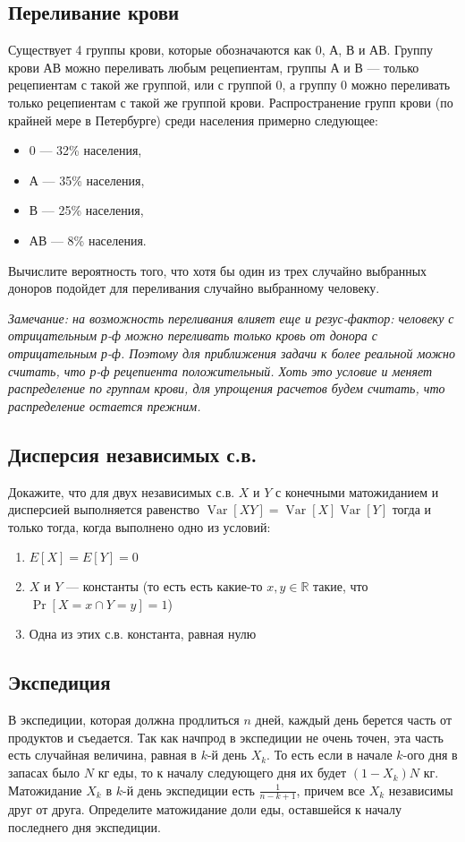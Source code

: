 \documentclass[12pt]{article}
\newcommand\R{\mathbb{R}}
\DeclareMathOperator{\Var}{Var}
\begin{document}
\subsection{Переливание крови}
Существует 4 группы крови, которые обозначаются как 0, А, В и АВ. Группу крови АВ можно переливать любым рецепиентам, группы А и В --- только рецепиентам с такой же группой, или с группой 0, а группу 0 можно переливать только рецепиентам с такой же группой крови. Распространение групп крови (по крайней мере в Петербурге) среди населения примерно следующее:
\begin{itemize}
    \item 0 --- 32\% населения,
    \item А --- 35\% населения,
    \item В --- 25\% населения,
    \item АВ --- 8\% населения.
\end{itemize}
Вычислите вероятность того, что хотя бы один из трех случайно выбранных доноров подойдет для переливания случайно выбранному человеку. 

\emph{Замечание: на возможность переливания влияет еще и резус-фактор: человеку с отрицательным р-ф можно переливать только кровь от донора с отрицательным р-ф. Поэтому для приближения задачи к более реальной можно считать, что р-ф рецепиента положительный. Хоть это условие и меняет распределение по группам крови, для упрощения расчетов будем считать, что распределение остается прежним.}

\subsection{Дисперсия независимых с.в.}
Докажите, что для двух независимых с.в. $X$ и $Y$ с конечными матожиданием и дисперсией выполняется равенство $\Var[XY] = \Var[X]\Var[Y]$ тогда и только тогда, когда выполнено одно из условий:
\begin{enumerate}
    \item $E[X] = E[Y] = 0$
    \item $X$ и $Y$ --- константы (то есть есть какие-то $x, y \in \R$ такие, что $\Pr[X = x \cap Y = y] = 1$)
    \item Одна из этих с.в. константа, равная нулю
\end{enumerate}

\subsection{Экспедиция}
В экспедиции, которая должна продлиться $n$ дней, каждый день берется часть от продуктов и съедается. Так как начпрод в экспедиции не очень точен, эта часть есть случайная величина, равная в $k$-й день $X_k$. То есть если в начале $k$-ого дня в запасах было $N$ кг еды, то к началу следующего дня их будет $(1 - X_k)N$ кг. Матожидание $X_k$ в $k$-й день экспедиции есть $\frac{1}{n - k + 1}$, причем все $X_k$ независимы друг от друга. Определите матожидание доли еды, оставшейся к началу последнего дня экспедиции.
\end{document}
